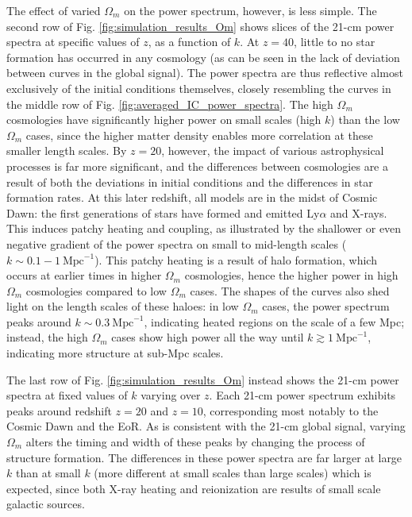 \documentclass[floats,floatfix,showpacs,amssymb,prd,superscriptaddress,nofootinbib, 11pt]{revtex4-2} %
\begin{document}
The effect of varied $\Omega_m$ on the power spectrum, however, is less simple. The second row of Fig. \ref{fig:simulation_results_Om} shows slices of the 21-cm power spectra at specific values of $z$, as a function of $k$. At $z = 40$, little to no star formation has occurred in any cosmology (as can be seen in the lack of deviation between curves in the global signal). The power spectra are thus reflective almost exclusively of the initial conditions themselves, closely resembling the curves in the middle row of Fig. \ref{fig:averaged_IC_power_spectra}.
The high $\Omega_m$ cosmologies have significantly higher power on small scales (high $k$) than the low $\Omega_m$ cases, since the higher matter density enables more correlation at these smaller length scales. By $z = 20$, however, the impact of various astrophysical processes is far more significant, and the differences between cosmologies are a result of both the deviations in initial conditions and the differences in star formation rates. At this later redshift, all models are in the midst of Cosmic Dawn: the first generations of stars have formed and emitted Ly$\alpha$ and X-rays. This induces patchy heating and coupling, as illustrated by the shallower or even negative gradient of the power spectra on small to mid-length scales ($k \sim 0.1 - 1 ~\text{Mpc}^{-1}$). This patchy heating is a result of halo formation, which occurs at earlier times in higher $\Omega_m$ cosmologies, hence the higher power in high $\Omega_m$ cosmologies compared to low $\Omega_m$ cases. The shapes of the curves also shed light on the length scales of these haloes: in low $\Omega_m$ cases, the power spectrum peaks around $k \sim 0.3 ~\text{Mpc}^{-1}$, indicating heated regions on the scale of a few Mpc; instead, the high $\Omega_m$ cases show high power all the way until $k \gtrsim 1 ~\text{Mpc}^{-1}$, indicating more structure at sub-Mpc scales. 



The last row of Fig. \ref{fig:simulation_results_Om} instead shows the 21-cm power spectra at fixed values of $k$ varying over $z$. Each 21-cm power spectrum exhibits peaks around redshift $z = 20$ and $z = 10$, corresponding most notably to the Cosmic Dawn and the EoR. As is consistent with the 21-cm global signal, varying $\Omega_m$ alters the timing and width of these peaks by changing the process of structure formation. The differences in these power spectra are far larger at large $k$ than at small $k$ (more different at small scales than large scales) which is expected, since both X-ray heating and reionization are results of small scale galactic sources. 
\end{document}
